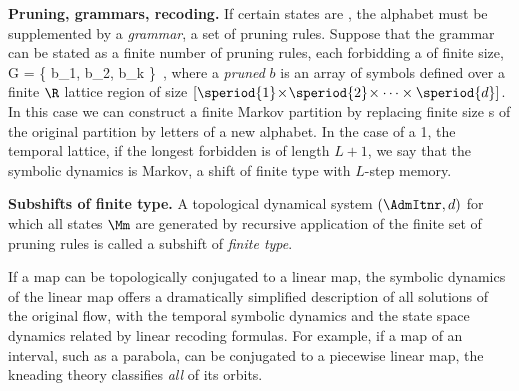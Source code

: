 {\bf Pruning, grammars, recoding.}
If certain states are {\inadmissible}, the alphabet must be supplemented by a
{\em grammar},
a set of pruning rules.
Suppose that
the grammar can be stated as a finite number of pruning rules, each
forbidding a {\brick} of finite size,
\beq
 {\cal G} = \left\{
        b_1, b_2, \cdots b_k
        \right\}
\,,
where a {\em pruned {\brick}} $b$ is an array of symbols defined over a
finite $\R$ lattice region of size
$[\speriod{1}\!\times\!\speriod{2}\!\times\cdots\times\speriod{d}]$. In
this case we can construct a finite Markov partition by replacing finite
size \brick s of the original partition by letters of a new alphabet. In
the case of a 1\dmn, the temporal lattice, if the longest forbidden {\brick}
is of length $L+1$, we say that the symbolic dynamics is Markov, a shift
of finite type with {$L$-step memory}.

{\bf Subshifts of finite type.}
A {topological dynamical system} $(\AdmItnr,\shift{})$ for which all
{\admissible} states $\Mm$ are generated by recursive application
of the finite set of pruning rules 
is called a subshift of {\em finite type}.

                                            \toCB %
If a map can be topologically conjugated to a linear map, the symbolic
dynamics of the linear map offers a dramatically simplified description
of all {\admissible} solutions of the original flow, with the temporal
symbolic dynamics and the state space dynamics related by linear recoding
formulas. For example, if a map of an interval, such as a parabola, can
be conjugated to a piecewise linear map, the kneading theory
classifies \emph{all} of its {\admissible} orbits.

\renewcommand{\statesp}{phase space}
\renewcommand{\Statesp}{Phase space}
\renewcommand{\stateDsp}{phase-space}
\renewcommand{\StateDsp}{Phase-space}



